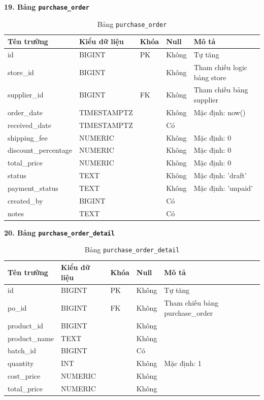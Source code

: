\documentclass[12pt,a4paper]{report}
\begin{document}
\vspace{0.3cm}
\textbf{19. Bảng \texttt{purchase\_order}}
\vspace{0.1cm}
\begin{longtable}{|>{\ttfamily}p{3.5cm}|p{2.5cm}|p{1.5cm}|p{1.5cm}|p{5cm}|}
\caption{Bảng \texttt{purchase\_order}} \label{tab:db_purchase_order} \\
\hline
\normalfont\textbf{Tên trường} & \textbf{Kiểu dữ liệu} & \textbf{Khóa} & \textbf{Null} & \textbf{Mô tả} \\ \hline
id & BIGINT & PK & Không & Tự tăng \\ \hline
store\_id & BIGINT & & Không & Tham chiếu logic bảng store \\ \hline
supplier\_id & BIGINT & FK & Không & Tham chiếu bảng supplier \\ \hline
order\_date & TIMESTAMPTZ & & Không & Mặc định: now() \\ \hline
received\_date & TIMESTAMPTZ & & Có & \\ \hline
shipping\_fee & NUMERIC & & Không & Mặc định: 0 \\ \hline
discount\_percentage & NUMERIC & & Không & Mặc định: 0 \\ \hline
total\_price & NUMERIC & & Không & Mặc định: 0 \\ \hline
status & TEXT & & Không & Mặc định: 'draft' \\ \hline
payment\_status & TEXT & & Không & Mặc định: 'unpaid' \\ \hline
created\_by & BIGINT & & Có & \\ \hline
notes & TEXT & & Có & \\ \hline
\end{longtable}

\vspace{0.3cm}
\textbf{20. Bảng \texttt{purchase\_order\_detail}}
\vspace{0.1cm}
\begin{longtable}{|>{\ttfamily}p{3.5cm}|p{2.5cm}|p{1.5cm}|p{1.5cm}|p{5cm}|}
\caption{Bảng \texttt{purchase\_order\_detail}} \label{tab:db_purchase_order_detail} \\
\hline
\normalfont\textbf{Tên trường} & \textbf{Kiểu dữ liệu} & \textbf{Khóa} & \textbf{Null} & \textbf{Mô tả} \\ \hline
id & BIGINT & PK & Không & Tự tăng \\ \hline
po\_id & BIGINT & FK & Không & Tham chiếu bảng purchase\_order \\ \hline
product\_id & BIGINT & & Không & \\ \hline
product\_name & TEXT & & Không & \\ \hline
batch\_id & BIGINT & & Có & \\ \hline
quantity & INT & & Không & Mặc định: 1 \\ \hline
cost\_price & NUMERIC & & Không & \\ \hline
total\_price & NUMERIC & & Không & \\ \hline
\end{longtable}
\end{document}
